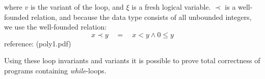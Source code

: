 where $v$ is the variant of the loop, and $\xi$ is a fresh logical variable. $\prec$ is a well-founded relation, and because the data type consists of all unbounded integers, we use the well-founded relation:
$$x \prec y \quad = \quad x < y \land 0 \leq y $$
reference: (poly1.pdf)

Using these loop invariants and variants it is possible to prove total correctness of programs containing \textit{while}-loops.


